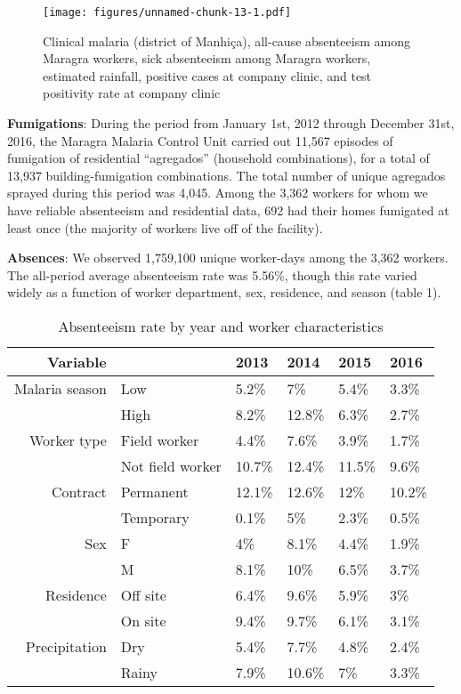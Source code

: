\documentclass[]{article}
\begin{document}
\begin{figure}
\centering
\texttt{[image: figures/unnamed-chunk-13-1.pdf]}
\caption{Clinical malaria (district of Manhiça), all-cause absenteeism
among Maragra workers, sick absenteeism among Maragra workers, estimated
rainfall, positive cases at company clinic, and test positivity rate at
company clinic}
\end{figure}

\textbf{Fumigations}: During the period from January 1st, 2012 through
December 31st, 2016, the Maragra Malaria Control Unit carried out 11,567
episodes of fumigation of residential ``agregados'' (household
combinations), for a total of 13,937 building-fumigation combinations.
The total number of unique agregados sprayed during this period was
4,045. Among the 3,362 workers for whom we have reliable absenteeism and
residential data, 692 had their homes fumigated at least once (the
majority of workers live off of the facility).

\textbf{Absences}: We observed 1,759,100 unique worker-days among the
3,362 workers. The all-period average absenteeism rate was 5.56\%,
though this rate varied widely as a function of worker department, sex,
residence, and season (table 1).

\begin{table}[ht]
\centering
\begin{tabular}{rlllll}
  \hline
Variable &  & 2013 & 2014 & 2015 & 2016 \\ 
  \hline
Malaria season & Low & 5.2\% & 7\% & 5.4\% & 3.3\% \\ 
   & High & 8.2\% & 12.8\% & 6.3\% & 2.7\% \\ 
  Worker type & Field worker & 4.4\% & 7.6\% & 3.9\% & 1.7\% \\ 
   & Not field worker & 10.7\% & 12.4\% & 11.5\% & 9.6\% \\ 
  Contract & Permanent & 12.1\% & 12.6\% & 12\% & 10.2\% \\ 
   & Temporary & 0.1\% & 5\% & 2.3\% & 0.5\% \\ 
  Sex & F & 4\% & 8.1\% & 4.4\% & 1.9\% \\ 
   & M & 8.1\% & 10\% & 6.5\% & 3.7\% \\ 
  Residence & Off site & 6.4\% & 9.6\% & 5.9\% & 3\% \\ 
   & On site & 9.4\% & 9.7\% & 6.1\% & 3.1\% \\ 
  Precipitation & Dry & 5.4\% & 7.7\% & 4.8\% & 2.4\% \\ 
   & Rainy & 7.9\% & 10.6\% & 7\% & 3.3\% \\ 
   \hline
\end{tabular}
\caption{Absenteeism rate by year and worker characteristics} 
\end{table}
\end{document}
